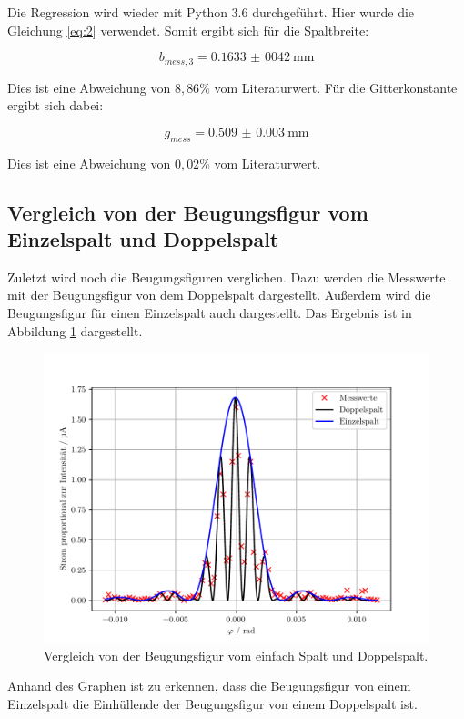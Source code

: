 Die Regression wird wieder mit Python 3.6 durchgeführt. Hier wurde die Gleichung \ref{eq:2} verwendet.
Somit ergibt sich für die Spaltbreite:

\begin{equation*}
  b_{mess,3} = \SI{0,1633(0042)}{\milli\metre}
\end{equation*}

Dies ist eine Abweichung von $8,86\%$ vom Literaturwert.
Für die Gitterkonstante ergibt sich dabei:

\begin{equation*}
  g_{mess} = \SI{0.509(3)}{\milli\metre}
\end{equation*}

Dies ist eine Abweichung von $0,02 \%$ vom Literaturwert.

\subsection{Vergleich von der Beugungsfigur vom Einzelspalt und Doppelspalt}

Zuletzt wird noch die Beugungsfiguren verglichen. Dazu werden die Messwerte mit der
Beugungsfigur von dem Doppelspalt dargestellt. Außerdem wird die Beugungsfigur für einen
Einzelspalt auch dargestellt. Das Ergebnis ist in Abbildung \ref{abb:7} dargestellt.

\begin{figure}[H]
  \centering
  \includegraphics{plot4.pdf}
  \caption{Vergleich von der Beugungsfigur vom einfach Spalt und Doppelspalt.}
  \label{abb:7}
\end{figure}

Anhand des Graphen ist zu erkennen, dass die Beugungsfigur von einem Einzelspalt
die Einhüllende der Beugungsfigur von einem Doppelspalt ist.

